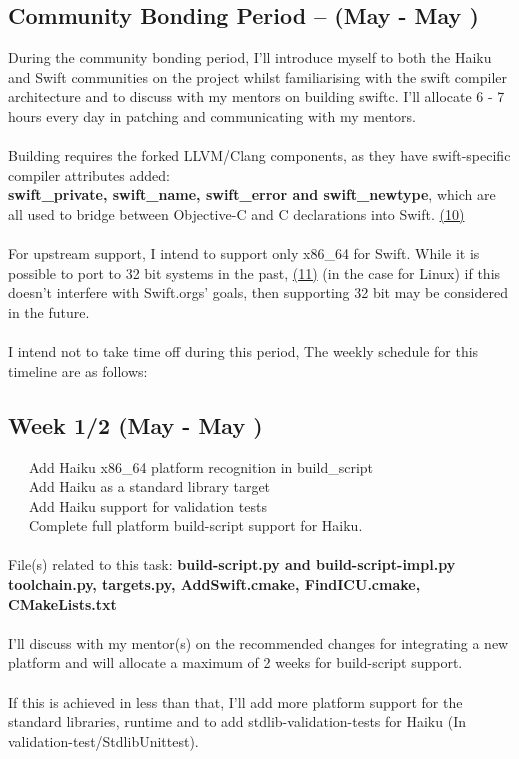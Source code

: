 \documentclass[12pt]{article}
\begin{document}
\subsection*{Community Bonding Period -- (May  - May )}
During the community bonding period, I'll introduce myself to both the Haiku and Swift communities on the project whilst familiarising with the swift compiler architecture and to discuss with my mentors on building swiftc. I'll allocate 6 - 7 hours every day in patching and communicating with my mentors. 
\\\\
Building requires the forked LLVM/Clang components, as they have swift-specific compiler attributes added: \\ \textbf{swift\_private, swift\_name, swift\_error and swift\_newtype}, which are all used to bridge between Objective-C and C declarations into Swift. \hyperlink{(10)}{(10)}
\\\\
For upstream support, I intend to support only x86\_64 for Swift. While it is possible to port to 32 bit systems in the past, \hyperlink{(11)}{(11)} (in the case for Linux) if this doesn't interfere with Swift.orgs' goals, then supporting 32 bit may be considered in the future.
\\\\
I intend not to take time off during this period, The weekly schedule for this timeline are as follows:


\subsection*{Week 1/2 (May  - May ) }
\textbullet \ \ \ Add Haiku x86\_64 platform recognition in build\_script\\
\textbullet \ \ \ Add Haiku as a standard library target\\
\textbullet \ \ \ Add Haiku support for validation tests\\
\textbullet \ \ \ Complete full platform build-script support for Haiku. \\
\\
File(s) related to this task: \textbf{build-script.py and build-script-impl.py toolchain.py, targets.py, AddSwift.cmake, FindICU.cmake, CMakeLists.txt}
\\\\
I'll discuss with my mentor(s) on the recommended changes for integrating a new platform and will allocate a maximum of 2 weeks for build-script support.
\\\\
If this is achieved in less than that, I'll add more platform support for the standard libraries, runtime and to add stdlib-validation-tests for Haiku (In validation-test/StdlibUnittest).
\end{document}
